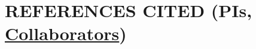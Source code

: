 
\clearpage
\section*{\normalsize{REFERENCES CITED \textnormal{(\textbf{PIs}, \underline{Collaborators})}}}


